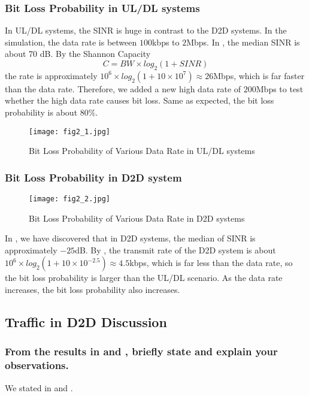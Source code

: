 \documentclass[conference]{IEEEtran}
\begin{document}
\subsubsection{Bit Loss Probability in UL/DL systems}\label{subsub:uldl}
In UL/DL systems, the SINR is huge in contrast to the D2D systems. In the simulation, the data rate is between $100$kbps to $2$Mbps. In , the median SINR is about 70 dB. By the Shannon Capacity
\begin{equation} \label{eqn:shannon}
    C = BW \times log_2(1 + SINR)
\end{equation}
the rate is approximately $10^6 \times log_2(1+ 10 \times 10^7) \approx 26$Mbps, which is far faster than the data rate. Therefore, we added a new high data rate of $200$Mbps to test whether the high data rate causes bit loss. Same as expected, the bit loss probability is about $80\%$.
\begin{figure}[htbp]
    \centering
    \texttt{[image: fig2\_1.jpg]}
    \caption{Bit Loss Probability of Various Data Rate in UL/DL systems}
    \label{fig:bit_uldl}
\end{figure}
\subsubsection{Bit Loss Probability in D2D system}\label{subsub:d2d}
\begin{figure}[htbp]
    \centering
    \texttt{[image: fig2\_2.jpg]}
    \caption{Bit Loss Probability of Various Data Rate in D2D systems}
    \label{fig:bit_d2d}
\end{figure}
In , we have discovered that in D2D systems, the median of SINR is approximately $-25$dB. By , the transmit rate of the D2D system is about $10^6 \times log_2(1+ 10 \times 10^{-2.5}) \approx 4.5$kbps, which is far less than the data rate, so the bit loss probability is larger than the UL/DL scenario. As the data rate increases, the bit loss probability also increases.
\subsection{Traffic in D2D Discussion}
\subsubsection{From the results in  and , briefly state and explain your observations.}
We stated in  and .
\end{document}
